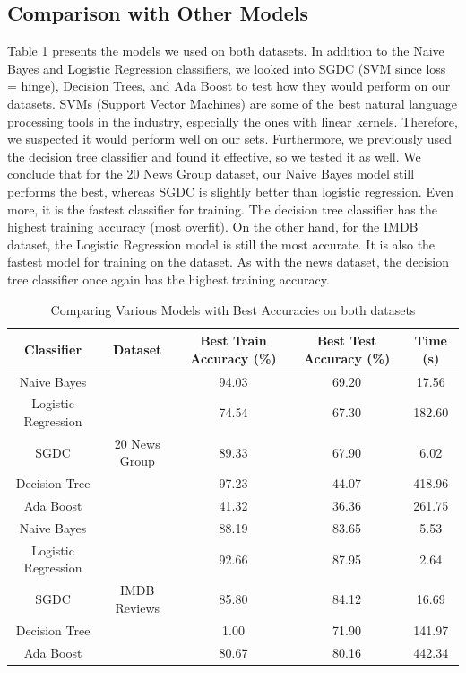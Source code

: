 \documentclass[11pt]{homework}
\begin{document}
\subsection{Comparison with Other Models}
Table \ref{table-models} presents the models we used on both datasets. In addition to the Naive Bayes and Logistic Regression classifiers, we looked into SGDC (SVM since loss = hinge), Decision Trees, and Ada Boost to test how they would perform on our datasets. SVMs (Support Vector Machines) are some of the best natural language processing tools in the industry, especially the ones with linear kernels. Therefore, we suspected it would perform well on our sets. Furthermore, we previously used the decision tree classifier and found it effective, so we tested it as well. We conclude that for the 20 News Group dataset, our Naive Bayes model still performs the best, whereas SGDC is slightly better than logistic regression. Even more, it is the fastest classifier for training. The decision tree classifier has the highest training accuracy (most overfit). On the other hand, for the IMDB dataset, the Logistic Regression model is still the most accurate. It is also the fastest model for training on the dataset. As with the news dataset, the decision tree classifier once again has the highest training accuracy. 


\begin{table}[h!] 
\centering
\begin{tabular}{||c c c c c||} 
 \hline
 Classifier & Dataset & Best Train Accuracy (\%) & Best Test Accuracy (\%) & Time (s)\\ [0.5ex] 
 \hline\hline
 \rowcolor{lightgray}Naive Bayes && 94.03 & 69.20 & 17.56 \\ 
 Logistic Regression && 74.54 & 67.30 & 182.60 \\
 SGDC & 20 News Group & 89.33 & 67.90 & 6.02 \\
 Decision Tree && 97.23 & 44.07 & 418.96 \\
  Ada Boost && 41.32 & 36.36 & 261.75\\
 \hline \hline
 Naive Bayes && 88.19 & 83.65 & 5.53 \\
\rowcolor{lightgray}Logistic Regression && 92.66 & 87.95 & 2.64 \\
 SGDC & IMDB Reviews & 85.80 & 84.12 & 16.69 \\
 Decision Tree && 1.00 & 71.90 & 141.97 \\
 Ada Boost && 80.67 & 80.16 & 442.34 \\[1ex] 
 \hline
\end{tabular}
\caption{Comparing Various Models with Best Accuracies on both datasets}
\label{table-models}
\end{table}
\end{document}
